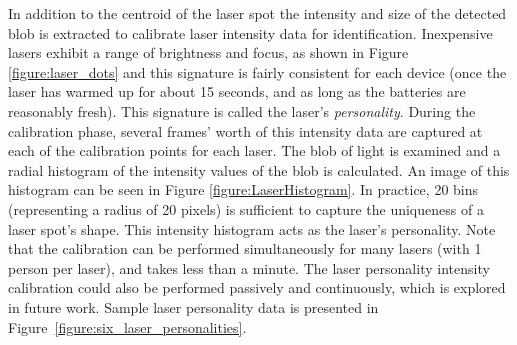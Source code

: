 In addition to the centroid of the laser spot the
intensity and size of the detected blob is extracted
to calibrate laser intensity data for identification.  Inexpensive
lasers exhibit a range of brightness and focus, as shown in
Figure \ref{figure:laser_dots} and this signature is fairly consistent
for each device (once the laser has warmed up for about 15 seconds,
and as long as the batteries are reasonably fresh). This
signature is called the laser's \textit{personality}.
During the calibration phase, several frames' worth of this
intensity data are captured at each of the calibration points for each laser. The blob of light 
is examined and a radial histogram of the intensity values of the blob is calculated. An image of this histogram can be seen in Figure \ref{figure:LaserHistogram}. 
In practice, 20 bins (representing a
radius of 20 pixels) is sufficient to capture the uniqueness of a
laser spot's shape.  This intensity histogram acts as the laser's
personality.
Note that the calibration can be performed simultaneously for many
lasers (with 1 person per laser), and takes less than a minute.  The
laser personality intensity calibration could also be performed
passively and continuously, which is explored in future work.
Sample laser personality data is presented in
Figure~\ref{figure:six_laser_personalities}.


